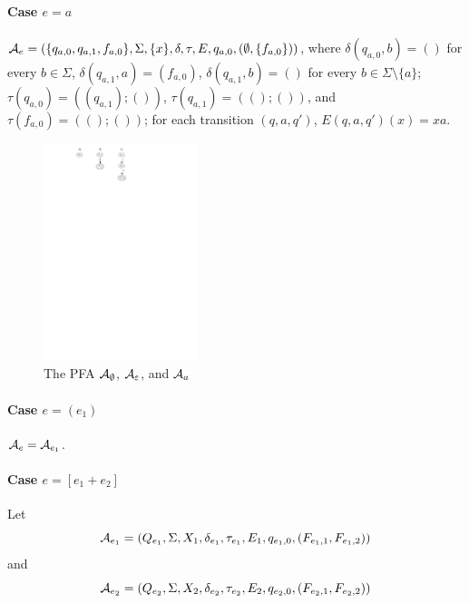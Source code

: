 \paragraph{Case $e = a$} $\mathcal{A}_e = (\{q_{a,0}, q_{a,1}, f_{a,0}\}, \Sigma, \{x\}, \delta, \tau, E, q_{a,0}, (\emptyset, \{f_{a,0}\}))$, where 
$\delta(q_{a,0}, b) = ()$ for every $b \in \Sigma$, $\delta(q_{a,1}, a) = (f_{a,0})$, $\delta(q_{a,1}, b) = ()$ for every $b \in \Sigma \setminus \{a\}$; 
%
$\tau(q_{a,0}) = ((q_{a,1}); ())$, $\tau(q_{a,1}) = ((); ())$, and $\tau(f_{a,0}) = ((); ())$; 
%
for each transition $(q, a, q')$, $E(q,a,q')(x) =xa$.
%		
\begin{figure}[ht]
			\centering
			\includegraphics[width = 0.4\textwidth]{reg2pfa-0.pdf}
			\caption{The PFA $\mathcal{A}_{\emptyset}$, $\mathcal{A}_{\varepsilon}$, and $\mathcal{A}_{a}$ }
			\label{fig-reg2pfa-0}
\end{figure}  

		
\paragraph{Case $e = (e_1)$} $\mathcal{A}_e = \mathcal{A}_{e_1}$.
		

\paragraph{Case $e = [e_1 + e_2]$} Let 
\[\mathcal{A}_{e_1} = (Q_{e_1}, \Sigma, X_1, \delta_{e_1}, \tau_{e_1}, E_1,  q_{e_1,0}, (F_{e_1,1}, F_{e_1,2}))\] and 
\[\mathcal{A}_{e_2} = (Q_{e_2}, \Sigma, X_2, \delta_{e_2}, \tau_{e_2}, E_2, q_{e_2,0}, (F_{e_2, 1}, F_{e_2,2}))\] 
 
